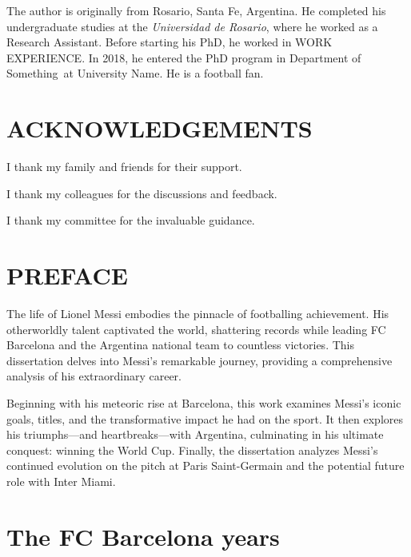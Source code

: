 \documentclass{report}
\newcommand{\university}{University Name}
\newcommand{\department}{Department of Something}
\begin{document}
The author is originally from Rosario, Santa Fe, Argentina.
He completed his undergraduate studies at the \textit{Universidad de Rosario},
where he worked as a Research Assistant.
Before starting his PhD, he worked in WORK EXPERIENCE.
In 2018, he entered the PhD program in \department\ at \university.
He is a football fan.

\chapter*{ACKNOWLEDGEMENTS}

I thank my family and friends for their support.

I thank my colleagues for the discussions and feedback.

I thank my committee for the invaluable guidance.

\chapter*{PREFACE}

The life of Lionel Messi embodies the pinnacle of footballing achievement. 
His otherworldly talent captivated the world, shattering records while leading 
FC Barcelona and the Argentina national team to countless victories.
This dissertation delves into Messi's remarkable journey, providing a 
comprehensive analysis of his extraordinary career.

Beginning with his meteoric rise at Barcelona, this work examines Messi's 
iconic goals, titles, and the transformative impact he had on the sport.
It then explores his triumphs---and heartbreaks---with Argentina, culminating in 
his ultimate conquest: winning the World Cup.
Finally, the dissertation analyzes Messi's continued evolution on the pitch 
at Paris Saint-Germain and the potential future role with Inter Miami.

\setcounter{tocdepth}{1} %

\tableofcontents
\listoftables
\listoffigures

\setcounter{page}{1}
\doublespacing

\clearpage

\setcounter{section}{0}%

\chapter{The FC Barcelona years}
\end{document}
